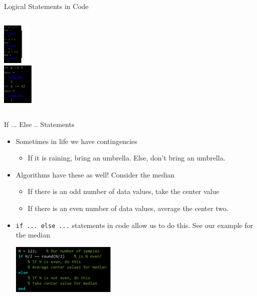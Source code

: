 {}\documentclass[letterpaper,
compress,
xcolor=x11names,
]{beamer}
\begin{document}
\begin{frame}{Logical Statements in Code}
\begin{columns}
\begin{column}{0.25\linewidth}
\begin{center}
				\includegraphics[height = 2cm]{inequality_example.png} \\
				\includegraphics[height = 2cm]{notequality_example.png}
			\end{center}
		\end{column}
	\end{columns}
\end{frame}


\begin{frame}{If ... Else .. Statements}
	\footnotesize
	\begin{itemize}
		\item Sometimes in life we have contingencies
		\begin{itemize}
			\item If it is raining, bring an umbrella. Else, don't bring an umbrella.
		\end{itemize}
		\item Algorithms have these as well! Consider the median
		\begin{itemize}
			\item If there is an odd number of data values, take the center value
			\item If there is an even number of data values, average the center two. 
		\end{itemize}
		\item \texttt{if ... else ...} statements in code allow us to do this. See our example for the median
		\begin{center}
			\includegraphics[width = 5cm]{median_if_example.png}
		\end{center}
	\end{itemize}
\end{frame}
\end{document}
